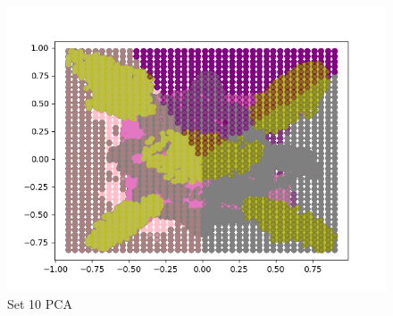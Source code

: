 \documentclass{article}
\begin{document}
\begin{figure}[H]
        \centering
	\begin{minipage}{.33\textwidth}
			\centering
			\includegraphics[width=1\linewidth]{../set10PCAdecisions.png}
			\caption{Set 10 PCA}
	\end{minipage}\hfill
\end{figure}
\end{document}
